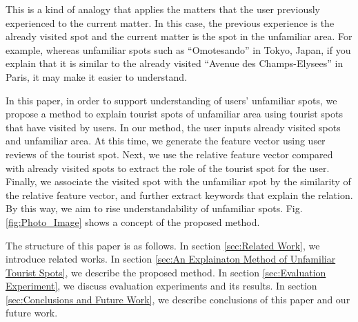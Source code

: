 \documentclass[journal]{IAENGtran}
\begin{document}
This is a kind of analogy that applies the matters that the user previously experienced to the current matter.
In this case, the previous experience is the already visited spot and the current matter is the spot in the unfamiliar area.
For example, whereas unfamiliar spots such as ``Omotesando'' in Tokyo, Japan, if you explain that it is similar to the already visited ``Avenue des Champs-Elysees'' in Paris, it may make it easier to understand.

In this paper, in order to support understanding of users' unfamiliar spots, we propose a method to explain tourist spots of unfamiliar area using tourist spots that have visited by users.
In our method, the user inputs already visited spots and unfamiliar area.
At this time, we generate the feature vector using user reviews of the tourist spot.
Next, we use the relative feature vector compared with already visited spots to extract the role of the tourist spot for the user.
Finally, we associate the visited spot with the unfamiliar spot by the similarity of the relative feature vector, and further extract keywords that explain the relation.
By this way, we aim to rise understandability of unfamiliar spots.
Fig. \ref{fig:Photo_Image} shows a concept of the proposed method.

The structure of this paper is as follows.
In section \ref{sec:Related Work}, we introduce related works.
In section \ref{sec:An Explainaton Method of Unfamiliar Tourist Spots}, we describe the proposed method.
In section \ref{sec:Evaluation Experiment}, we discuss evaluation experiments and its results.
In section \ref{sec:Conclusions and Future Work}, we describe conclusions of this paper and our future work.
\end{document}
